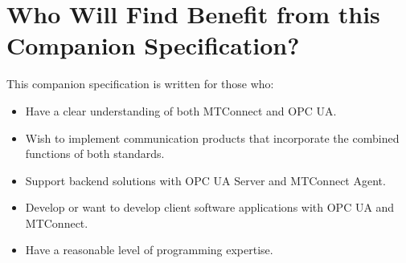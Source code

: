\section{Who Will Find Benefit from this Companion Specification?}\label{whowillbenefit}

This companion specification is written for those who:
\begin{itemize}
    \item Have a clear understanding of both MTConnect and OPC UA.
    \item Wish to implement communication products that incorporate the combined functions of both standards.
    \item Support backend solutions with OPC UA Server and MTConnect Agent.
    \item Develop or want to develop client software applications with OPC UA and MTConnect.
    \item Have a reasonable level of programming expertise.
\end{itemize}